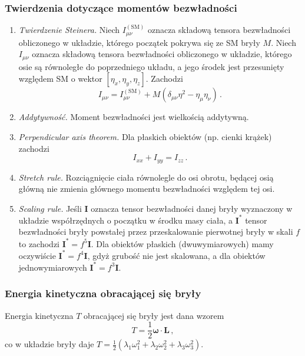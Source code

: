 \documentclass[../main.tex]{subfiles}
\begin{document}
\subsubsection*{Twierdzenia dotyczące momentów bezwładności}
\begin{enumerate}
    \item \textit{Twierdzenie Steinera.} Niech \(I_{\mu\nu}^{(\text{SM})}\) oznacza składową tensora
    bezwładności obliczonego w układzie, którego początek pokrywa się ze SM bryły \(M\). Niech
    \(I_{\mu\nu}\) oznacza składową tensora bezwładności obliczonego w układzie, którego osie są
    równoległe do poprzedniego układu, a jego środek jest przesunięty względem SM o wektor
    \([\eta_x, \eta_y,\eta_z]\). Zachodzi
    \begin{equation*}
        I_{\mu\nu}=I_{\mu\nu}^{(\text{SM})}+M\left(\delta_{\mu\nu}\eta^2-\eta_\mu\eta_\nu\right)\,.
    \end{equation*}
    
    \item \textit{Addytywność.} Moment bezwładności jest wielkością addytywną.
    \item \textit{Perpendicular axis theorem.} Dla płaskich obiektów (np. cienki krążek) zachodzi
    \begin{equation*}
        I_{xx}+I_{yy}=I_{zz}\,.
    \end{equation*}
    \item \textit{Stretch rule.} Rozciągnięcie ciała równolegle do osi obrotu, będącej osią główną
    nie zmienia głównego momentu bezwładności względem tej osi.
    \item \textit{Scaling rule.} Jeśli \(\mathbf{I}\) oznacza tensor bezwładności danej bryły
    wyznaczony w układzie współrzędnych o początku w środku masy ciała, a \(\mathbf{I}^*\) tensor
    bezwładności bryły powstałej przez przeskalowanie pierwotnej bryły w skali \(f\) to zachodzi
    \(\mathbf{I}^*=f^5\mathbf{I}\). Dla obiektów płaskich (dwuwymiarowych) mamy oczywiście
    \(\mathbf{I}^*=f^4\mathbf{I}\), gdyż grubość nie jest skalowana, a dla obiektów jednowymiarowych
    \(\mathbf{I}^*=f^3\mathbf{I}\).
\end{enumerate}

\subsubsection*{Energia kinetyczna obracającej się bryły}
Energia kinetyczna \(T\) obracającej się bryły jest dana wzorem
\begin{equation*}
    T=\frac{1}{2}\boldsymbol{\omega}\cdot \mathbf{L}\,,
\end{equation*}
co w układzie bryły daje
\(T=\frac{1}{2}(\lambda_1\omega_1^2+\lambda_2\omega_2^2+\lambda_3\omega_3^2)\). 
\end{document}
